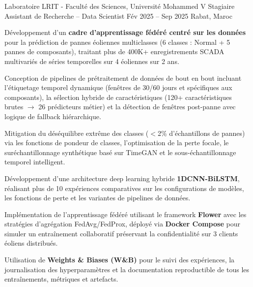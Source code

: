 \documentclass[11pt, a4paper]{awesome-cv}
\begin{document}
\vspace{-0.3cm}
\cventry
  {Laboratoire LRIT - Faculté des Sciences, Université Mohammed V}
  {Stagiaire Assistant de Recherche -- Data Scientist}
  {Fév 2025 -- Sep 2025}
  {Rabat, Maroc}
  {
    \begin{cvitems}
      \item {Développement d'un \textbf{cadre d'apprentissage fédéré centré sur les données} pour la prédiction de pannes éoliennes multiclasses (6 classes : Normal + 5 pannes de composants), traitant plus de 400K+ enregistrements SCADA multivariés de séries temporelles sur 4 éoliennes sur 2 ans.}
      \item {Conception de pipelines de prétraitement de données de bout en bout incluant l'étiquetage temporel dynamique (fenêtres de 30/60 jours et spécifiques aux composants), la sélection hybride de caractéristiques (120+ caractéristiques brutes $\rightarrow$ 26 prédicteurs métier) et la détection de fenêtres post-panne avec logique de fallback hiérarchique.}
      \item {Mitigation du déséquilibre extrême des classes ($<$2\% d'échantillons de pannes) via les fonctions de pondeur de classes, l'optimisation de la perte focale, le suréchantillonnage synthétique basé sur TimeGAN et le sous-échantillonnage temporel intelligent.}
      \item {Développement d'une architecture deep learning hybride \textbf{1DCNN-BiLSTM}, réalisant plus de 10 expériences comparatives sur les configurations de modèles, les fonctions de perte et les variantes de pipelines de données.}
      \item {Implémentation de l'apprentissage fédéré utilisant le framework \textbf{Flower} avec les stratégies d'agrégation FedAvg/FedProx, déployé via \textbf{Docker Compose} pour simuler un entraînement collaboratif préservant la confidentialité sur 3 clients éoliens distribués.}
      \item {Utilisation de \textbf{Weights \& Biases (W\&B)} pour le suivi des expériences, la journalisation des hyperparamètres et la documentation reproductible de tous les entraînements, métriques et artefacts.}
    \end{cvitems}
  }

\vspace{-0.4cm}
\vspace{0.1cm}
\begin{cvskills}
\end{cvskills}
\end{document}
